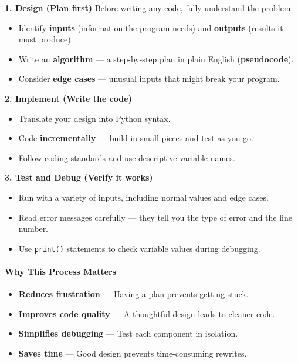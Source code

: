 \documentclass[
  justified,
  openright,
]{tufte-book}
\let\subsection\paragraph
\let\paragraph\paragraph
\let\subsection\paragraph
\let\paragraph\paragraph
\providecommand{\tightlist}{%
  \setlength{\itemsep}{0pt}\setlength{\parskip}{0pt}}
\begin{document}
\textbf{1. Design (Plan first)} Before writing any code, fully
understand the problem:

\begin{itemize}
\tightlist
\item
  Identify \textbf{inputs} (information the program needs) and
  \textbf{outputs} (results it must produce).
\item
  Write an \textbf{algorithm} --- a step-by-step plan in plain English
  (\textbf{pseudocode}).
\item
  Consider \textbf{edge cases} --- unusual inputs that might break your
  program.
\end{itemize}

\textbf{2. Implement (Write the code)}

\begin{itemize}
\tightlist
\item
  Translate your design into Python syntax.
\item
  Code \textbf{incrementally} --- build in small pieces and test as you
  go.
\item
  Follow coding standards and use descriptive variable names.
\end{itemize}

\textbf{3. Test and Debug (Verify it works)}

\begin{itemize}
\tightlist
\item
  Run with a variety of inputs, including normal values and edge cases.
\item
  Read error messages carefully --- they tell you the type of error and
  the line number.
\item
  Use \texttt{print()} statements to check variable values during
  debugging.
\end{itemize}

\subsection{Why This Process Matters}\label{why-this-process-matters}

\begin{itemize}
\tightlist
\item
  \textbf{Reduces frustration} --- Having a plan prevents getting stuck.
\item
  \textbf{Improves code quality} --- A thoughtful design leads to
  cleaner code.
\item
  \textbf{Simplifies debugging} --- Test each component in isolation.
\item
  \textbf{Saves time} --- Good design prevents time-consuming rewrites.
\end{itemize}
\end{document}
